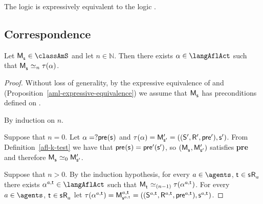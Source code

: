 \begin{corollary}
The logic \logicAflS{} is expressively equivalent to the logic \logicS{}.
\end{corollary}

\subsection{Correspondence}

\begin{theorem}\label{afl-s-correspondence}
Let $\aPModel{\aStateS} \in \classAmS$ and let $n \in \mathbb{N}$. 
Then there exists $\alpha \in \langAflAct$ such that $\aPModel{\aStateS} \bisimilar[n] \tau(\alpha)$.
\end{theorem}

\begin{proof}
Without loss of generality, by the expressive equivalence of \logicAmlS{} and \logicS{} (Proposition~\ref{aml-expressive-equivalence}) we assume that $\aPModel{\aStateS}$ has preconditions defined on \langMl{}.

By induction on $n$.

Suppose that $n = 0$. 
Let $\alpha = \test{\aPrecondition(\aStateS)}$ and $\tau(\alpha) = \aPModelP{\aStateSP} = \aPModelTupleP{\aStateSP}$. 
From Definition~\ref{afl-k-test} we have that $\aPrecondition(\aStateS) = \aPreconditionP(\aStateSP)$, so $(\aPModel{\aStateS}, \aPModelP{\aStateSP})$ satisfies {\bf pre} and therefore $\aPModel{\aStateS} \bisimilar[0] \aPModelP{\aStateSP}$.

Suppose that $n > 0$. 
By the induction hypothesis, for every $\agentA \in \agents$, $\aStateT \in \aStateS \aAccessibility{\agentA}$ there exists $\alpha^{\agentA,\aStateT} \in \langAflAct$ such that 
$\aPModel{\aStateT} \bisimilar[(n - 1)] \tau(\alpha^{\agentA,\aStateT})$. 
For every $\agentA \in \agents$, $\aStateT \in \aStateS \aAccessibility{\agentA}$ let $\tau(\alpha^{\agentA,\aStateT}) = \aPModel[\agentA,\aStateT]{\aStateS[\agentA,\aStateT]} = \aPModelTuple[\agentA,\aStateT]{\aStateS[\agentA,\aStateT]}$.


\end{proof}
